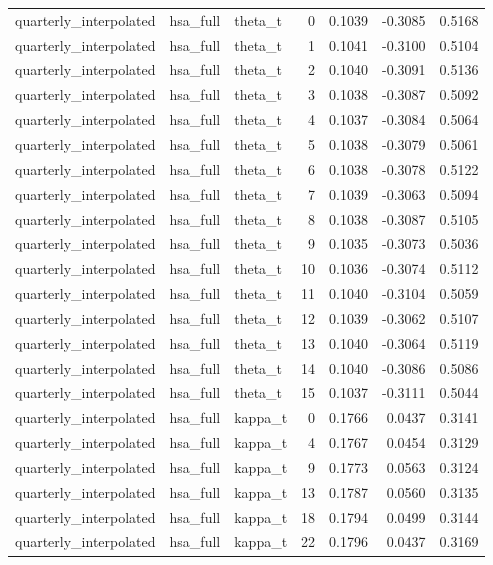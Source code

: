 \begin{tabular}{lllrrrr}
quarterly\_interpolated & hsa\_full & theta\_t & 0 & 0.1039 & -0.3085 & 0.5168 \\
quarterly\_interpolated & hsa\_full & theta\_t & 1 & 0.1041 & -0.3100 & 0.5104 \\
quarterly\_interpolated & hsa\_full & theta\_t & 2 & 0.1040 & -0.3091 & 0.5136 \\
quarterly\_interpolated & hsa\_full & theta\_t & 3 & 0.1038 & -0.3087 & 0.5092 \\
quarterly\_interpolated & hsa\_full & theta\_t & 4 & 0.1037 & -0.3084 & 0.5064 \\
quarterly\_interpolated & hsa\_full & theta\_t & 5 & 0.1038 & -0.3079 & 0.5061 \\
quarterly\_interpolated & hsa\_full & theta\_t & 6 & 0.1038 & -0.3078 & 0.5122 \\
quarterly\_interpolated & hsa\_full & theta\_t & 7 & 0.1039 & -0.3063 & 0.5094 \\
quarterly\_interpolated & hsa\_full & theta\_t & 8 & 0.1038 & -0.3087 & 0.5105 \\
quarterly\_interpolated & hsa\_full & theta\_t & 9 & 0.1035 & -0.3073 & 0.5036 \\
quarterly\_interpolated & hsa\_full & theta\_t & 10 & 0.1036 & -0.3074 & 0.5112 \\
quarterly\_interpolated & hsa\_full & theta\_t & 11 & 0.1040 & -0.3104 & 0.5059 \\
quarterly\_interpolated & hsa\_full & theta\_t & 12 & 0.1039 & -0.3062 & 0.5107 \\
quarterly\_interpolated & hsa\_full & theta\_t & 13 & 0.1040 & -0.3064 & 0.5119 \\
quarterly\_interpolated & hsa\_full & theta\_t & 14 & 0.1040 & -0.3086 & 0.5086 \\
quarterly\_interpolated & hsa\_full & theta\_t & 15 & 0.1037 & -0.3111 & 0.5044 \\
quarterly\_interpolated & hsa\_full & kappa\_t & 0 & 0.1766 & 0.0437 & 0.3141 \\
quarterly\_interpolated & hsa\_full & kappa\_t & 4 & 0.1767 & 0.0454 & 0.3129 \\
quarterly\_interpolated & hsa\_full & kappa\_t & 9 & 0.1773 & 0.0563 & 0.3124 \\
quarterly\_interpolated & hsa\_full & kappa\_t & 13 & 0.1787 & 0.0560 & 0.3135 \\
quarterly\_interpolated & hsa\_full & kappa\_t & 18 & 0.1794 & 0.0499 & 0.3144 \\
quarterly\_interpolated & hsa\_full & kappa\_t & 22 & 0.1796 & 0.0437 & 0.3169 \\

\end{tabular}
